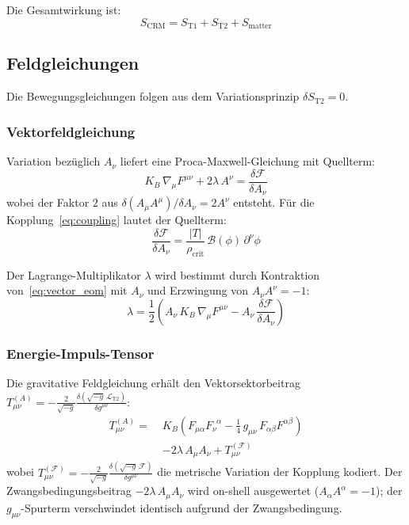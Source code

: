 \documentclass[aps,prd,twocolumn,superscriptaddress,nofootinbib]{revtex4-2}
\begin{document}
Die Gesamtwirkung ist:
\begin{equation}
S_{\mathrm{CRM}} = S_{\mathrm{T1}} + S_{\mathrm{T2}} + S_{\mathrm{matter}}
\label{eq:S_total}
\end{equation}

\subsection{Feldgleichungen}
\label{sec:field_eqs}

Die Bewegungsgleichungen folgen aus dem Variationsprinzip $\delta S_{\mathrm{T2}} = 0$.

\subsubsection{Vektorfeldgleichung}

Variation bez\"uglich $A_\nu$ liefert eine Proca-Maxwell-Gleichung mit Quellterm:
\begin{equation}
K_B\,\nabla_\mu F^{\mu\nu} + 2\lambda\,A^\nu = \frac{\delta\mathcal{F}}{\delta A_\nu}
\label{eq:vector_eom}
\end{equation}
wobei der Faktor $2$ aus $\delta(A_\mu A^\mu)/\delta A_\nu = 2A^\nu$ entsteht. F\"ur die Kopplung~\eqref{eq:coupling} lautet der Quellterm:
\begin{equation}
\frac{\delta\mathcal{F}}{\delta A_\nu} = \frac{|T|}{\rho_{\mathrm{crit}}}\,\mathcal{B}(\phi)\,\partial^\nu\phi
\label{eq:source}
\end{equation}

Der Lagrange-Multiplikator $\lambda$ wird bestimmt durch Kontraktion von~\eqref{eq:vector_eom} mit $A_\nu$ und Erzwingung von $A_\nu A^\nu = -1$:
\begin{equation}
\lambda = \frac{1}{2}\left(A_\nu\,K_B\,\nabla_\mu F^{\mu\nu} - A_\nu\,\frac{\delta\mathcal{F}}{\delta A_\nu}\right)
\label{eq:lambda}
\end{equation}

\subsubsection{Energie-Impuls-Tensor}

Die gravitative Feldgleichung erh\"alt den Vektorsektorbeitrag $T^{(A)}_{\mu\nu} = -\frac{2}{\sqrt{-g}}\frac{\delta(\sqrt{-g}\,\mathcal{L}_{\mathrm{T2}})}{\delta g^{\mu\nu}}$:
\begin{align}
T^{(A)}_{\mu\nu} = \;&K_B\!\left(F_{\mu\alpha}F_\nu^{\phantom{\nu}\alpha} - \tfrac{1}{4}\,g_{\mu\nu}\,F_{\alpha\beta}F^{\alpha\beta}\right) \nonumber\\
&- 2\lambda\,A_\mu A_\nu + T^{(\mathcal{F})}_{\mu\nu}
\label{eq:T_vector}
\end{align}
wobei $T^{(\mathcal{F})}_{\mu\nu} = -\frac{2}{\sqrt{-g}}\frac{\delta(\sqrt{-g}\,\mathcal{F})}{\delta g^{\mu\nu}}$ die metrische Variation der Kopplung kodiert. Der Zwangsbedingungsbeitrag $-2\lambda\,A_\mu A_\nu$ wird on-shell ausgewertet ($A_\alpha A^\alpha = -1$); der $g_{\mu\nu}$-Spurterm verschwindet identisch aufgrund der Zwangsbedingung.
\end{document}

